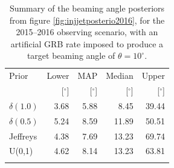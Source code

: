 \documentclass[twocolumn]{aastex61}
\begin{document}
\begin{table}
  \centering
  \begin{tabular}{lrrrr}
    \toprule
    Prior & Lower & MAP & Median & Upper\\
          & [$^\circ$] & [$^\circ$]& [$^\circ$]& [$^\circ$] \\
    \colrule
    $\delta(1.0)$ & 3.68	 & 5.88	 & 8.45	         & 39.44	 \\
    $\delta(0.5)$ & 5.24	 & 8.59	 & 11.89	 & 50.51	 \\
    Jeffreys      & 4.38	 & 7.69	 & 13.23	 & 69.74	 \\
    U(0,1)        & 4.62	 & 8.14	 & 13.23	 & 63.81	 \\
    \botrule
\end{tabular}
\caption{Summary of the beaming angle posteriors from figure
  \ref{fig:injjetposterio2016}, for the 2015--2016 observing scenario,
  with an artificial GRB rate imposed to produce a target beaming
  angle of $\theta = 10^{\circ}$.
  \label{tab:summaryinj2015}}
\end{table}

%
\end{document}
